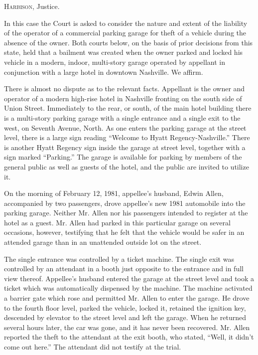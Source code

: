 
\opinion \textsc{Harbison}, Justice.

In this case the Court is asked to consider the nature and extent of the
liability of the operator of a commercial parking garage for theft of a vehicle
during the absence of the owner. Both courts below, on the basis of prior
decisions from this state, held that a bailment was created when the owner
parked and locked his vehicle in a modern, indoor, multi-story garage operated
by appellant in conjunction with a large hotel in downtown Nashville. We
affirm.

There is almost no dispute as to the relevant facts. Appellant is the owner and
operator of a modern high-rise hotel in Nashville fronting on the south side of
Union Street. Immediately to the rear, or south, of the main hotel building
there is a multi-story parking garage with a single entrance and a single exit
to the west, on Seventh Avenue, North. As one enters the parking garage at the
street level, there is a large sign reading ``Welcome to Hyatt
Regency-Nashville.'' There is another Hyatt Regency sign inside the garage at
street level, together with a sign marked ``Parking.'' The garage is available
for parking by members of the general public as well as guests of the hotel,
and the public are invited to utilize it.

On the morning of February 12, 1981, appellee's husband, Edwin Allen,
accompanied by two passengers, drove appellee's new 1981 automobile into the
parking garage. Neither Mr. Allen nor his passengers intended to register at
the hotel as a guest. Mr. Allen had parked in this particular garage on several
occasions, however, testifying that he felt that the vehicle would be safer in
an attended garage than in an unattended outside lot on the street.

The single entrance was controlled by a ticket machine. The single exit was
controlled by an attendant in a booth just opposite to the entrance and in full
view thereof. Appellee's husband entered the garage at the street level and
took a ticket which was automatically dispensed by the machine. The machine
activated a barrier gate which rose and permitted Mr. Allen to enter the
garage. He drove to the fourth floor level, parked the vehicle, locked it,
retained the ignition key, descended by elevator to the street level and left
the garage. When he returned several hours later, the car was gone, and it has
never been recovered. Mr. Allen reported the theft to the attendant at the exit
booth, who stated, ``Well, it didn't come out here.'' The attendant did not
testify at the trial.

